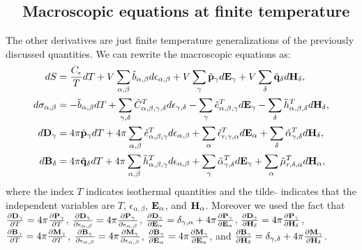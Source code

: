 \documentclass[12pt,a4paper,twoside]{report}
\begin{document}
{\subsection{\color{orange}\ \ Macroscopic equations at finite temperature}
The other derivatives are just finite temperature generalizations of the
previously discussed quantities. We can rewrite the macroscopic equations as:
\begin{align}
dS&= {C_\epsilon\over T} dT+ V \sum_{\alpha,\beta} \tilde b_{\alpha,\beta} 
d\epsilon_{\alpha,\beta}
+ V \sum_\gamma \tilde {\bf p}_\gamma d{\bf E}_{\gamma} +
V \sum_\delta \tilde {\bf q}_\delta d{\bf H}_{\delta}, \\
d\sigma_{\alpha,\beta}&= -\tilde b_{\alpha,\beta} dT + 
\sum_{\gamma,\delta} \tilde C^T_{\alpha,\beta,\gamma,\delta} 
d \epsilon_{\gamma,\delta} - \sum_\gamma \tilde e^T_{\alpha,\beta,\gamma} 
d{\bf E}_{\gamma} -
\sum_\delta \tilde h^T_{\alpha,\beta,\delta} d{\bf H}_{\delta}, \\
d{\bf D}_\gamma&=
4 \pi \tilde {\bf p}_\gamma dT + 4 \pi \sum_{\alpha,\beta} \tilde 
e^T_{\alpha,\beta,\gamma} d\epsilon_{\alpha,\beta}
+ \sum_\alpha \tilde \epsilon^T_{r,\gamma,\alpha} 
d{\bf E}_{\alpha} + 
\sum_\delta \tilde \alpha^T_{\gamma,\delta} d{\bf H}_{\delta}, 
\label{dcgs} \\
d{\bf B}_\delta&=
4 \pi \tilde {\bf q}_\delta dT+ 4 \pi \sum_{\alpha,\beta}
\tilde h^T_{\alpha,\beta,\gamma}
d\epsilon_{\alpha,\beta}
+ \sum_\gamma \tilde \alpha^T_{\gamma,\delta}
d{\bf E}_{\gamma}+ 
\sum_\alpha \tilde \mu^{T}_{r,\delta,\alpha}
d{\bf H}_{\alpha}, \label{bcgs}
\end{align}
where the index $T$ indicates isothermal quantities and 
the tilde $\tilde{ }$ indicates that the independent variables are
$T$, $\epsilon_{\alpha,\beta}$, ${\bf E}_\alpha$, and ${\bf H}_\alpha$. 
Moreover we used the fact that 
${\partial {\bf D}_\gamma \over \partial T} =
4 \pi {\partial {\bf P}_\gamma \over \partial T}$,
${\partial {\bf D}_\gamma \over \partial \epsilon_{\alpha,\beta}}=
4 \pi {\partial {\bf P}_\gamma \over \partial \epsilon_{\alpha,\beta}}$,
${\partial {\bf D}_\gamma \over \partial {\bf E}_{\alpha}}=  
\delta_{\gamma,\alpha} + 4 \pi 
{\partial {\bf P}_\gamma \over \partial {\bf E}_{\alpha}}$, 
${\partial {\bf D}_\gamma \over \partial {\bf H}_{\delta}}= 
4 \pi {\partial {\bf P}_\gamma \over \partial {\bf H}_{\delta}}$, 
${\partial {\bf B}_\gamma \over \partial T} = 4 \pi
{\partial {\bf M}_\gamma \over \partial T}$,
${\partial {\bf B}_\gamma \over \partial \epsilon_{\alpha,\beta}}= 4 \pi
{\partial {\bf M}_\gamma \over \partial \epsilon_{\alpha,\beta}}$,
${\partial {\bf B}_\gamma \over \partial {\bf E}_{\alpha}}= 4 \pi
{\partial {\bf M}_\gamma \over \partial {\bf E}_{\alpha}}$, and
${\partial {\bf B}_\gamma \over \partial {\bf H}_{\delta}}= 
\delta_{\gamma,\delta} + 4 \pi
{\partial {\bf M}_\gamma \over \partial {\bf H}_{\delta}}$. 

}
\end{document}
